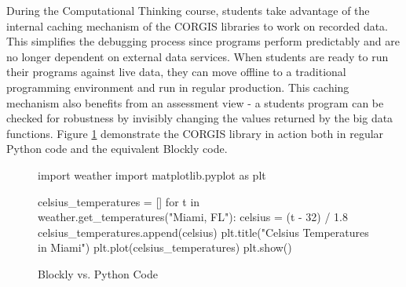 During the Computational Thinking course, students take advantage of the internal caching mechanism of the CORGIS libraries to work on recorded data.
This simplifies the debugging process since programs perform predictably and are no longer dependent on external data services.
When students are ready to run their programs against live data, they can move offline to a traditional programming environment and run in regular production.
This caching mechanism also benefits from an assessment view - a students program can be checked for robustness by invisibly changing the values returned by the big data functions.
Figure \ref{fig-example-blockly} demonstrate the CORGIS library in action both in regular Python code and the equivalent Blockly code.

\begin{figure}
\caption{Blockly vs. Python Code}
\label{fig-example-blockly}
\centering
\begin{minipage}[b]{.75\linewidth}
\end{minipage}

\smallskip

\begin{minipage}[b]{.75\linewidth}
\begin{python}
import weather
import matplotlib.pyplot as plt

celsius_temperatures = []
for t in weather.get_temperatures("Miami, FL"):
	celsius = (t - 32) / 1.8
	celsius_temperatures.append(celsius)
plt.title("Celsius Temperatures in Miami")
plt.plot(celsius_temperatures)
plt.show()
\end{python}
\end{minipage}
\end{figure}

